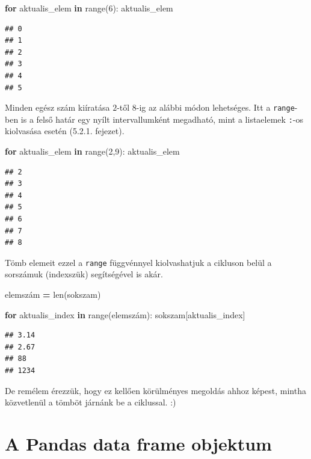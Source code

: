 \documentclass[
]{book}
\newenvironment{Shaded}{\begin{snugshade}}{\end{snugshade}}
\newcommand{\BuiltInTok}[1]{#1}
\newcommand{\ControlFlowTok}[1]{\textcolor[rgb]{0.13,0.29,0.53}{\textbf{#1}}}
\newcommand{\DecValTok}[1]{\textcolor[rgb]{0.00,0.00,0.81}{#1}}
\newcommand{\KeywordTok}[1]{\textcolor[rgb]{0.13,0.29,0.53}{\textbf{#1}}}
\newcommand{\NormalTok}[1]{#1}
\newcommand{\OperatorTok}[1]{\textcolor[rgb]{0.81,0.36,0.00}{\textbf{#1}}}
\begin{document}
\begin{Shaded}
\begin{Highlighting}[]
\ControlFlowTok{for}\NormalTok{ aktualis\_elem }\KeywordTok{in} \BuiltInTok{range}\NormalTok{(}\DecValTok{6}\NormalTok{):}
\NormalTok{  aktualis\_elem}
\end{Highlighting}
\end{Shaded}

\begin{verbatim}
## 0
## 1
## 2
## 3
## 4
## 5
\end{verbatim}

Minden egész szám kiíratása \(2\)-től \(8\)-ig az alábbi módon lehetséges. Itt a \texttt{range}-ben is a felső határ egy nyílt intervallumként megadható, mint a listaelemek \texttt{:}-os kiolvasása esetén (5.2.1. fejezet).

\begin{Shaded}
\begin{Highlighting}[]
\ControlFlowTok{for}\NormalTok{ aktualis\_elem }\KeywordTok{in} \BuiltInTok{range}\NormalTok{(}\DecValTok{2}\NormalTok{,}\DecValTok{9}\NormalTok{):}
\NormalTok{  aktualis\_elem}
\end{Highlighting}
\end{Shaded}

\begin{verbatim}
## 2
## 3
## 4
## 5
## 6
## 7
## 8
\end{verbatim}

Tömb elemeit ezzel a \texttt{range} függvénnyel kiolvashatjuk a cikluson belül a sorszámuk (indexszük) segítségével is akár.

\begin{Shaded}
\begin{Highlighting}[]
\NormalTok{elemszám }\OperatorTok{=} \BuiltInTok{len}\NormalTok{(sokszam)}

\ControlFlowTok{for}\NormalTok{ aktualis\_index }\KeywordTok{in} \BuiltInTok{range}\NormalTok{(elemszám):}
\NormalTok{  sokszam[aktualis\_index]}
\end{Highlighting}
\end{Shaded}

\begin{verbatim}
## 3.14
## 2.67
## 88
## 1234
\end{verbatim}

De remélem érezzük, hogy ez kellően körülményes megoldás ahhoz képest, mintha közvetlenül a tömböt járnánk be a ciklussal. :)

\section{A Pandas data frame objektum}\label{a-pandas-data-frame-objektum}
\end{document}
